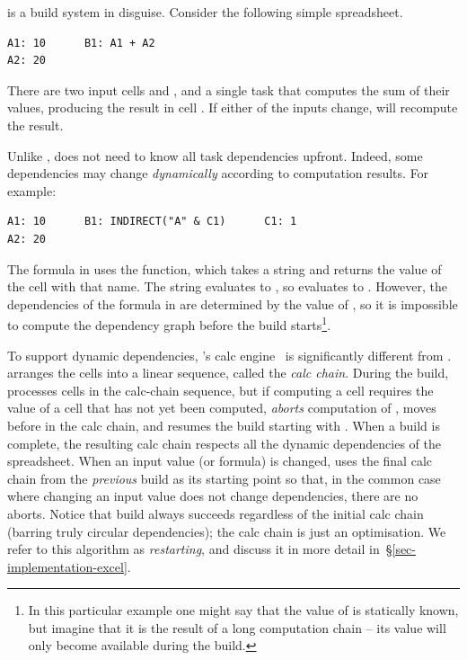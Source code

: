 \Excel is a build system in disguise. Consider the following simple spreadsheet.

\vspace{1mm}
\begin{verbatim}
A1: 10      B1: A1 + A2
A2: 20
\end{verbatim}
\vspace{1mm}

\noindent
There are two input cells  and , and a single task that computes
the sum of their values, producing the result in cell . If either of
the inputs change, \Excel will recompute the result.

Unlike \Make, \Excel does not need to know all task dependencies upfront. Indeed, some
dependencies may change \emph{dynamically} according to computation results. For
example:

\vspace{1mm}
\begin{verbatim}
A1: 10      B1: INDIRECT("A" & C1)      C1: 1
A2: 20
\end{verbatim}
\vspace{1mm}

\noindent
The formula in  uses the  function, which takes a string
and returns the value of the cell with that name.  The string evaluates to
, so  evaluates to . However, the dependencies of the
formula in  are determined by the value of , so it is impossible
to compute the dependency graph before the build starts\footnote{In
this particular example one might say that the value of
 is statically known, but imagine that it is the result of a long
computation chain -- its value will only become available during the build.}.

To support dynamic dependencies, \Excel's calc engine~\cite{excel_recalc} is
significantly different from \Make. \Excel arranges the cells into a linear
sequence, called the \emph{calc chain}.  During the build, \Excel processes
cells in the calc-chain sequence, but if computing a cell  requires the
value of a cell  that has not yet been computed, \Excel \emph{aborts}
computation of , moves  before  in the calc chain, and
resumes the build starting with . When a build is complete, the resulting
calc chain respects all the dynamic dependencies of the spreadsheet. When an
input value (or formula) is changed, \Excel uses the final calc chain from the
\emph{previous} build as its starting point so that, in the common case where
changing an input value does not change dependencies, there are no aborts.
Notice that build always succeeds regardless of the initial calc chain (barring
truly circular dependencies); the calc chain is just an optimisation.
We refer to this algorithm as \emph{restarting}, and discuss it
in more detail in~\S\ref{sec-implementation-excel}.

